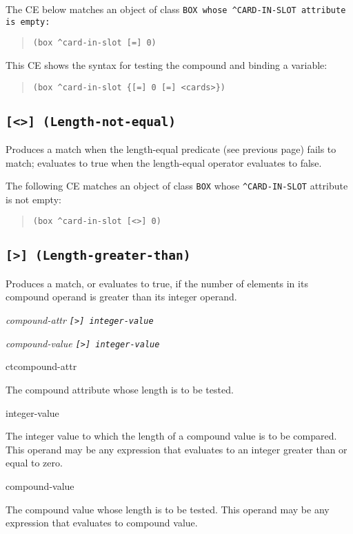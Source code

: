 \Example

The CE below matches an object of class \tt{BOX} whose
\verb|^CARD-IN-SLOT| attribute is empty:

\begin{quote}
\begin{verbatim}
(box ^card-in-slot [=] 0)
\end{verbatim}
\end{quote}

This CE shows the syntax for testing the compound and binding a
variable:

\begin{quote}
\begin{verbatim}
(box ^card-in-slot {[=] 0 [=] <cards>})
\end{verbatim}
\end{quote}

\subsection{\tt{[<>]} (Length-not-equal)}

Produces a match when the length-equal predicate (see previous page)
fails to match; evaluates to true when the length-equal operator
evaluates to false.

\Example

The following CE matches an object of class \verb|BOX| whose
\verb|^CARD-IN-SLOT| attribute is not empty:

\begin{quote}
\begin{verbatim}
(box ^card-in-slot [<>] 0)
\end{verbatim}
\end{quote}

\subsection{\tt{[>]} (Length-greater-than)}

Produces a match, or evaluates to true, if the number of elements in
its compound operand is greater than its integer operand.

\Format

\ct\it{compound-attr} \tt{[>]} \it{integer-value}

\it{compound-value} \tt{[>]} \it{integer-value}

\begin{operands}
\item[ct{compound-attr}]

  The compound attribute whose length is to be tested.

\item[integer-value]

  The integer value to which the length of a compound value is to be
  compared. This operand may be any expression that evaluates to an
  integer greater than or equal to zero.

\item[compound-value]

  The compound value whose length is to be tested. This operand may be
  any expression that evaluates to compound value.
\end{operands}

